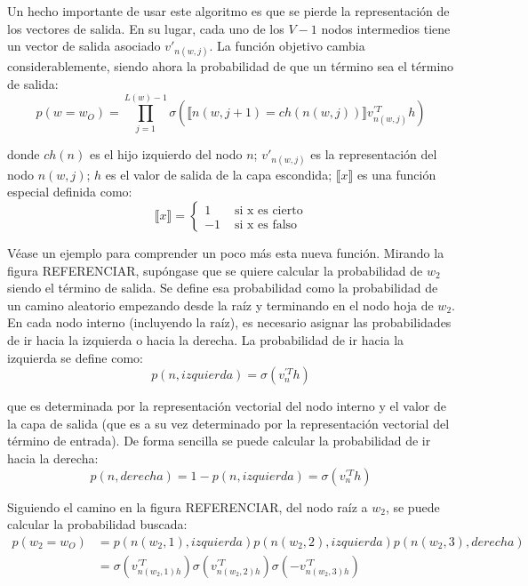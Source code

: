 
Un hecho importante de usar este algoritmo es que se pierde la representación de los vectores de salida. En su lugar, cada uno de los $V-1$ nodos intermedios tiene un vector de salida asociado
$v'_{n(w,j)}$. La función objetivo cambia considerablemente, siendo ahora la probabilidad de que un término sea el término de salida:
\begin{equation}\label{eq:soft}
  p\left( w=w_O \right) = \prod_{j=1}^{L(w)-1}\sigma\left( \llbracket n(w, j+1)=ch(n(w,j))\rrbracket v^{'T}_{n(w,j)}h \right)
\end{equation}

donde $ch(n)$ es el hijo izquierdo del nodo $n$; $v'_{n(w,j)}$ es la representación del nodo $n(w,j)$; $h$ es el valor de salida de la capa escondida; $\llbracket x\rrbracket$ es una función especial
definida como:
\begin{equation}
  \llbracket x \rrbracket = \begin{cases}
    1 & \text{ si x es cierto} \\
    -1 & \text{ si x es falso}
  \end{cases}
\end{equation}

Véase un ejemplo para comprender un poco más esta nueva función. Mirando la figura REFERENCIAR, supóngase que se quiere calcular la probabilidad de $w_2$ siendo el término de salida. Se define esa
probabilidad como la probabilidad de un camino aleatorio empezando desde la raíz y terminando en el nodo hoja de $w_2$. En cada nodo interno (incluyendo la raíz), es necesario asignar las probabilidades
de ir hacia la izquierda o hacia la derecha. La probabilidad de ir hacia la izquierda se define como:
\begin{equation}
  p\left( n, izquierda \right) = \sigma\left( v^{'T}_n h \right)
\end{equation}

que es determinada por la representación vectorial del nodo interno y el valor de la capa de salida (que es a su vez determinado por la representación vectorial del término de entrada). De forma sencilla
se puede calcular la probabilidad de ir hacia la derecha:
\begin{equation}
  p\left( n, derecha \right) = 1 - p\left( n, izquierda \right) = \sigma\left( v^{'T}_n h \right)
\end{equation}

Siguiendo el camino en la figura REFERENCIAR, del nodo raíz a $w_2$, se puede calcular la probabilidad buscada:
\begin{align}
  p\left( w_2 = w_O \right) & = p\left( n(w_2, 1), izquierda \right) p\left( n(w_2, 2), izquierda \right) p\left(n(w_2, 3), derecha\right)\\
                            & = \sigma\left( v^{'T}_{n(w_2, 1)h} \right) \sigma\left( v^{'T}_{n(w_2, 2)h} \right) \sigma\left( - v^{'T}_{n(w_2, 3)h} \right)
\end{align}

